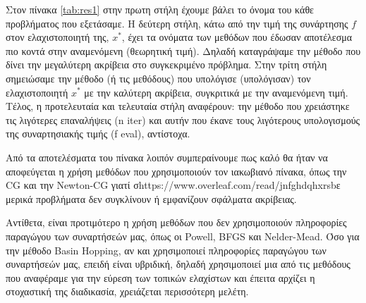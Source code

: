 \documentclass[a4paper,12pt,twoside]{report}
\theoremstyle{plain}
\theoremstyle{definition}
\theoremstyle{remark}
\begin{document}
Στον πίνακα \ref{tab:res1} στην πρωτη στήλη έχουμε βάλει το όνομα του κάθε προβλήματος που εξετάσαμε. Η δεύτερη στήλη, κάτω από την τιμή της συνάρτησης $f$ στον ελαχιστοποιητή της, $x^{*}$, έχει τα ονόματα των μεθόδων που έδωσαν αποτέλεσμα πιο κοντά στην αναμενόμενη (θεωρητική τιμή). Δηλαδή καταγράψαμε την μέθοδο που δίνει την μεγαλύτερη ακρίβεια στο συγκεκριμένο πρόβλημα. Στην τρίτη στήλη σημειώσαμε την μέθοδο (ή τις μεθόδους) που υπολόγισε (υπολόγισαν) τον ελαχιστοποιητή $x^{*}$ με την καλύτερη ακρίβεια, συγκριτικά με την αναμενόμενη τιμή. Τέλος, η προτελευταία και τελευταία στήλη αναφέρουν: την μέθοδο που χρειάστηκε τις λιγότερες επαναλήψεις (n iter) και αυτήν που έκανε τους λιγότερους υπολογισμούς της συναρτησιακής τιμής (f eval), αντίστοχα.

Από τα αποτελέσματα του πίνακα λοιπόν συμπεραίνουμε πως καλό θα ήταν να αποφεύγεται η χρήση μεθόδων που χρησιμοποιούν τον ιακωβιανό πίνακα, όπως την CG και την Newton-CG γιατί σhttps://www.overleaf.com/read/jnfghdqhxrsbε μερικά προβλήματα δεν συγκλίνουν ή εμφανίζουν σφάλματα ακρίβειας. 

Αντίθετα, είναι προτιμότερο η χρήση μεθόδων που δεν χρησιμοποιούν πληροφορίες παραγώγου των συναρτήσεών μας, όπως οι Powell, BFGS και Nelder-Mead. Όσο για την μέθοδο Basin Hopping, αν και χρησιμοποιεί πληροφορίες παραγώγου των συναρτήσεών μας, επειδή είναι υβριδική, δηλαδή χρησιμοποιεί μια από τις μεθόδους που αναφέραμε για την εύρεση των τοπικών ελαχίστων και έπειτα αρχίζει η στοχαστική της διαδικασία, χρειάζεται περισσότερη μελέτη.


\newpage
{}



\end{document}
